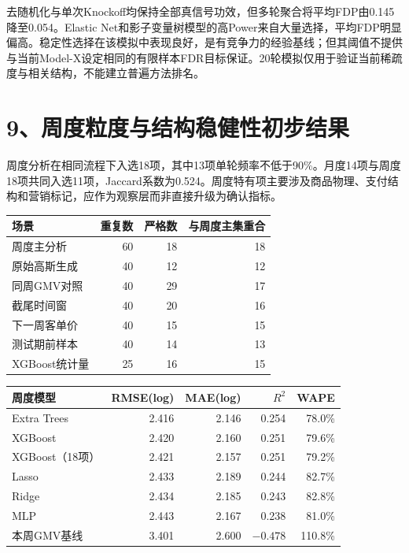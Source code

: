 \documentclass[UTF8,12pt,a4paper]{ctexart}
\begin{document}
去随机化与单次Knockoff均保持全部真信号功效，但多轮聚合将平均FDP由0.145降至0.054。Elastic Net和影子变量树模型的高Power来自大量选择，平均FDP明显偏高。稳定性选择在该模拟中表现良好，是有竞争力的经验基线；但其阈值不提供与当前Model-X设定相同的有限样本FDR目标保证。20轮模拟仅用于验证当前稀疏度与相关结构，不能建立普遍方法排名。

\newpage
\section*{9、周度粒度与结构稳健性初步结果}

周度分析在相同流程下入选18项，其中13项单轮频率不低于90\%。月度14项与周度18项共同入选11项，Jaccard系数为0.524。周度特有项主要涉及商品物理、支付结构和营销标记，应作为观察层而非直接升级为确认指标。

\begin{center}
\scriptsize
\renewcommand{\arraystretch}{1.15}
\begin{tabular}{lrrr}
\toprule
场景 & 重复数 & 严格数 & 与周度主集重合\\
\midrule
周度主分析 & 60 & 18 & 18\\
原始高斯生成 & 40 & 12 & 12\\
同周GMV对照 & 40 & 29 & 17\\
截尾时间窗 & 40 & 20 & 16\\
下一周客单价 & 40 & 15 & 15\\
测试期前样本 & 40 & 14 & 13\\
XGBoost统计量 & 25 & 16 & 15\\
\bottomrule
\end{tabular}
\end{center}

\begin{center}
\scriptsize
\begin{tabular}{lrrrr}
\toprule
周度模型 & RMSE(log) & MAE(log) & $R^2$ & WAPE\\
\midrule
Extra Trees & 2.416 & 2.146 & 0.254 & 78.0\%\\
XGBoost & 2.420 & 2.160 & 0.251 & 79.6\%\\
XGBoost（18项） & 2.421 & 2.157 & 0.251 & 79.2\%\\
Lasso & 2.433 & 2.189 & 0.244 & 82.7\%\\
Ridge & 2.434 & 2.185 & 0.243 & 82.8\%\\
MLP & 2.443 & 2.167 & 0.238 & 81.0\%\\
本周GMV基线 & 3.401 & 2.600 & $-0.478$ & 110.8\%\\
\bottomrule
\end{tabular}
\end{center}
\end{document}
